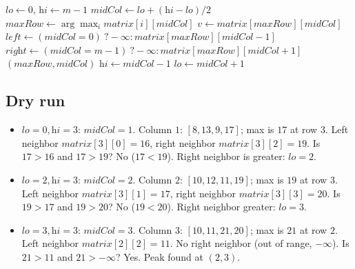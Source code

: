\begin{algorithm}[H]
\caption{Find Peak Element in a 2D Matrix}
\begin{algorithmic}[1]
  \State $\textit{lo} \gets 0$, $\textit{hi} \gets m-1$
    \State $\textit{midCol} \gets \textit{lo}+(\textit{hi}-\textit{lo})/2$
    \State $\textit{maxRow} \gets \arg\max_i \textit{matrix}[i][\textit{midCol}]$
    \State $v \gets \textit{matrix}[\textit{maxRow}][\textit{midCol}]$
    \State $\textit{left} \gets (\textit{midCol}=0)\ ? -\infty : \textit{matrix}[\textit{maxRow}][\textit{midCol}-1]$
    \State $\textit{right} \gets (\textit{midCol}=m-1)\ ? -\infty : \textit{matrix}[\textit{maxRow}][\textit{midCol}+1]$
      \State \Return $(\textit{maxRow}, \textit{midCol})$
      \State $\textit{hi} \gets \textit{midCol} - 1$
    \Else
      \State $\textit{lo} \gets \textit{midCol} + 1$
    \EndIf
  \EndWhile
\EndProcedure
\end{algorithmic}
\end{algorithm}

\subsection*{Dry run}


\begin{itemize}
  \item $\textit{lo}=0,\textit{hi}=3$: $\textit{midCol}=1$. Column $1$:
        $[8,13,9,17]$; max is $17$ at row $3$. Left neighbor
        $\textit{matrix}[3][0]=16$, right neighbor
        $\textit{matrix}[3][2]=19$. Is $17 > 16$ and $17 > 19$? No
        ($17 < 19$). Right neighbor is greater: $\textit{lo}=2$.
  \item $\textit{lo}=2,\textit{hi}=3$: $\textit{midCol}=2$. Column $2$:
        $[10,12,11,19]$; max is $19$ at row $3$. Left neighbor
        $\textit{matrix}[3][1]=17$, right neighbor
        $\textit{matrix}[3][3]=20$. Is $19>17$ and $19>20$? No
        ($19<20$). Right neighbor greater: $\textit{lo}=3$.
  \item $\textit{lo}=3,\textit{hi}=3$: $\textit{midCol}=3$. Column $3$:
        $[10,11,21,20]$; max is $21$ at row $2$. Left neighbor
        $\textit{matrix}[2][2]=11$. No right neighbor (out of range,
        $-\infty$). Is $21>11$ and $21>-\infty$? Yes. Peak found at
        $(2,3)$.
\end{itemize}

